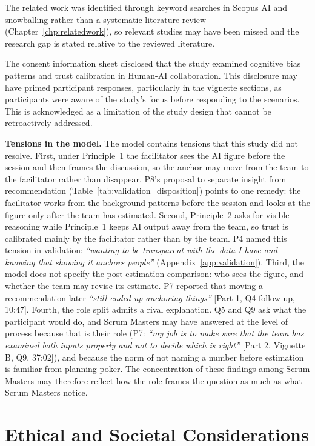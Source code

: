 \documentclass[a4paper,twoside]{bth}
\begin{document}
The related work was identified through keyword searches in Scopus AI and snowballing rather than a systematic literature review (Chapter~\ref{chp:relatedwork}), so relevant studies may have been missed and the research gap is stated relative to the reviewed literature.

The consent information sheet disclosed that the study examined cognitive bias patterns and trust calibration in Human-AI collaboration. This disclosure may have primed participant responses, particularly in the vignette sections, as participants were aware of the study's focus before responding to the scenarios. This is acknowledged as a limitation of the study design that cannot be retroactively addressed.

\textbf{Tensions in the model.} The model contains tensions that this study did not resolve. First, under Principle~1 the facilitator sees the AI figure before the session and then frames the discussion, so the anchor may move from the team to the facilitator rather than disappear. P8's proposal to separate insight from recommendation (Table~\ref{tab:validation_disposition}) points to one remedy: the facilitator works from the background patterns before the session and looks at the figure only after the team has estimated. Second, Principle~2 asks for visible reasoning while Principle~1 keeps AI output away from the team, so trust is calibrated mainly by the facilitator rather than by the team. P4 named this tension in validation: \textit{``wanting to be transparent with the data I have and knowing that showing it anchors people''} (Appendix~\ref{app:validation}). Third, the model does not specify the post-estimation comparison: who sees the figure, and whether the team may revise its estimate. P7 reported that moving a recommendation later \textit{``still ended up anchoring things''} [Part 1, Q4 follow-up, 10:47]. Fourth, the role split admits a rival explanation. Q5 and Q9 ask what the participant would do, and Scrum Masters may have answered at the level of process because that is their role (P7: \textit{``my job is to make sure that the team has examined both inputs properly and not to decide which is right''} [Part 2, Vignette B, Q9, 37:02]), and because the norm of not naming a number before estimation is familiar from planning poker. The concentration of these findings among Scrum Masters may therefore reflect how the role frames the question as much as what Scrum Masters notice.

\section{Ethical and Societal Considerations}
\end{document}

